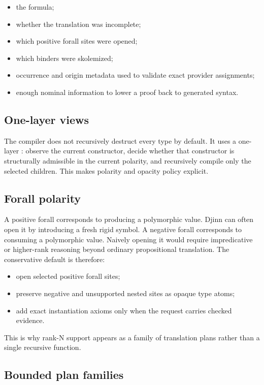 \documentclass[10pt,letterpaper,oneside]{report}
\newcommand{\code}[1]{\texttt{\detokenize{#1}}}
\begin{document}
\begin{itemize}
  \item the formula;
  \item whether the translation was incomplete;
  \item which positive forall sites were opened;
  \item which binders were skolemized;
  \item occurrence and origin metadata used to validate exact provider assignments;
  \item enough nominal information to lower a proof back to generated syntax.
\end{itemize}

\subsection{One-layer views}

The compiler does not recursively destruct every type by default. It uses a one-layer \code{TypeView}: observe the current constructor, decide whether that constructor is structurally admissible in the current polarity, and recursively compile only the selected children. This makes polarity and opacity policy explicit.

\subsection{Forall polarity}

A positive forall corresponds to producing a polymorphic value. Djinn can often open it by introducing a fresh rigid symbol. A negative forall corresponds to consuming a polymorphic value. Naively opening it would require impredicative or higher-rank reasoning beyond ordinary propositional translation. The conservative default is therefore:

\begin{itemize}
  \item open selected positive forall sites;
  \item preserve negative and unsupported nested sites as opaque type atoms;
  \item add exact instantiation axioms only when the request carries checked evidence.
\end{itemize}

This is why rank-N support appears as a family of translation plans rather than a single recursive function.

\subsection{Bounded plan families}
\end{document}
